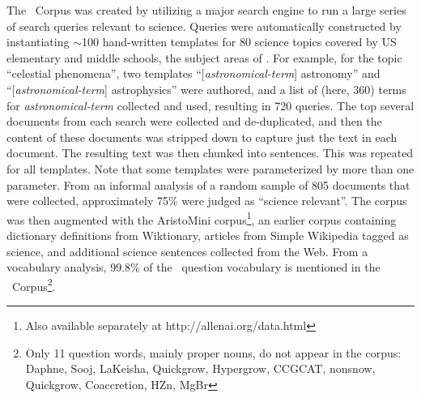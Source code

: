 The \ASC~Corpus was created by utilizing a major search engine to
run a large series of search queries relevant to science. Queries were automatically constructed 
by instantiating $\sim$100 hand-written templates for 80 science topics covered by US elementary and
middle schools, the subject areas of \ASC. For example, for the
topic ``celestial phenomena'', two templates ``[{\it astronomical-term}] astronomy'' and
``[{\it astronomical-term}] astrophysics'' were authored, and a list of (here, 360) terms for {\it astronomical-term} collected and used, 
resulting in 720 queries. The top several documents from each search were collected and de-duplicated, and then the content of these documents was stripped down to capture just the text in each document. The resulting text was then chunked into sentences. This was repeated for all templates.
Note that some templates were parameterized by more than one parameter.
From an informal analysis of a random sample of 805 documents that were collected, approximately 75\% were judged as ``science relevant''.
The corpus was then augmented with the AristoMini corpus\footnote{Also available separately at http://allenai.org/data.html}, an earlier corpus containing
dictionary definitions from Wiktionary, articles from Simple Wikipedia tagged as science,
and additional science sentences collected from the Web.
From a vocabulary analysis, 99.8\% of the \ASC~question vocabulary is mentioned in the \ASC~Corpus\footnote{
  Only 11 question words, mainly proper nouns, do not appear in the corpus: Daphne, Sooj, LaKeisha, Quickgrow, Hypergrow, CCGCAT, nonsnow,
  Quickgrow, Coaccretion, HZn, MgBr}.

